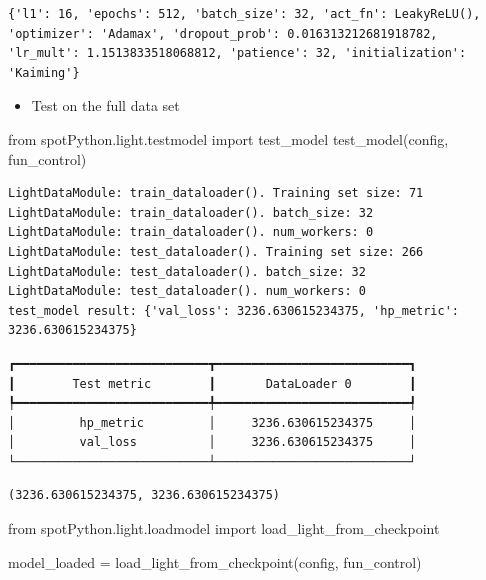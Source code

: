 \documentclass[
  letterpaper,
  DIV=11,
  numbers=noendperiod]{scrreprt}
\newenvironment{Shaded}{\begin{snugshade}}{\end{snugshade}}
\newcommand{\ImportTok}[1]{\textcolor[rgb]{0.00,0.46,0.62}{#1}}
\newcommand{\NormalTok}[1]{\textcolor[rgb]{0.00,0.23,0.31}{#1}}
\newcommand{\OperatorTok}[1]{\textcolor[rgb]{0.37,0.37,0.37}{#1}}
\providecommand{\tightlist}{%
  \setlength{\itemsep}{0pt}\setlength{\parskip}{0pt}}\usepackage{longtable,booktabs,array}
\begin{document}
\begin{verbatim}
{'l1': 16, 'epochs': 512, 'batch_size': 32, 'act_fn': LeakyReLU(), 'optimizer': 'Adamax', 'dropout_prob': 0.016313212681918782, 'lr_mult': 1.1513833518068812, 'patience': 32, 'initialization': 'Kaiming'}
\end{verbatim}

\begin{itemize}
\tightlist
\item
  Test on the full data set
\end{itemize}

\begin{Shaded}
\begin{Highlighting}[]
\ImportTok{from}\NormalTok{ spotPython.light.testmodel }\ImportTok{import}\NormalTok{ test\_model}
\NormalTok{test\_model(config, fun\_control)}
\end{Highlighting}
\end{Shaded}

\begin{verbatim}
LightDataModule: train_dataloader(). Training set size: 71
LightDataModule: train_dataloader(). batch_size: 32
LightDataModule: train_dataloader(). num_workers: 0
LightDataModule: test_dataloader(). Training set size: 266
LightDataModule: test_dataloader(). batch_size: 32
LightDataModule: test_dataloader(). num_workers: 0
test_model result: {'val_loss': 3236.630615234375, 'hp_metric': 3236.630615234375}
\end{verbatim}

\begin{verbatim}
┏━━━━━━━━━━━━━━━━━━━━━━━━━━━┳━━━━━━━━━━━━━━━━━━━━━━━━━━━┓
┃        Test metric        ┃       DataLoader 0        ┃
┡━━━━━━━━━━━━━━━━━━━━━━━━━━━╇━━━━━━━━━━━━━━━━━━━━━━━━━━━┩
│         hp_metric         │     3236.630615234375     │
│         val_loss          │     3236.630615234375     │
└───────────────────────────┴───────────────────────────┘
\end{verbatim}

\begin{verbatim}
(3236.630615234375, 3236.630615234375)
\end{verbatim}

\begin{Shaded}
\begin{Highlighting}[]
\ImportTok{from}\NormalTok{ spotPython.light.loadmodel }\ImportTok{import}\NormalTok{ load\_light\_from\_checkpoint}

\NormalTok{model\_loaded }\OperatorTok{=}\NormalTok{ load\_light\_from\_checkpoint(config, fun\_control)}
\end{Highlighting}
\end{Shaded}
\end{document}
